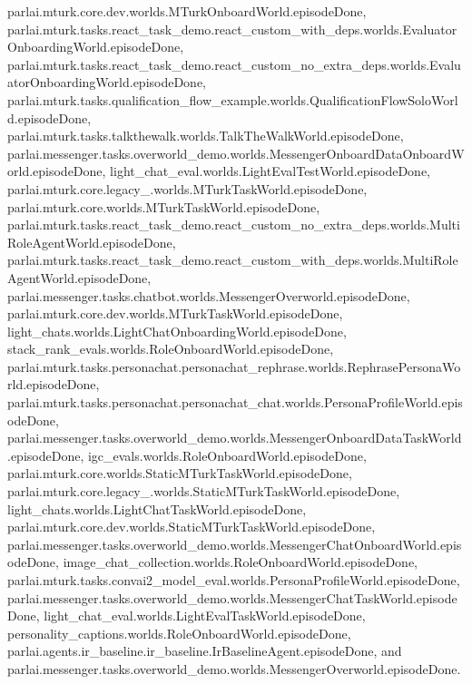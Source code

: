 parlai.\+mturk.\+core.\+dev.\+worlds.\+M\+Turk\+Onboard\+World.\+episode\+Done, parlai.\+mturk.\+tasks.\+react\+\_\+task\+\_\+demo.\+react\+\_\+custom\+\_\+with\+\_\+deps.\+worlds.\+Evaluator\+Onboarding\+World.\+episode\+Done, parlai.\+mturk.\+tasks.\+react\+\_\+task\+\_\+demo.\+react\+\_\+custom\+\_\+no\+\_\+extra\+\_\+deps.\+worlds.\+Evaluator\+Onboarding\+World.\+episode\+Done, parlai.\+mturk.\+tasks.\+qualification\+\_\+flow\+\_\+example.\+worlds.\+Qualification\+Flow\+Solo\+World.\+episode\+Done, parlai.\+mturk.\+tasks.\+talkthewalk.\+worlds.\+Talk\+The\+Walk\+World.\+episode\+Done, parlai.\+messenger.\+tasks.\+overworld\+\_\+demo.\+worlds.\+Messenger\+Onboard\+Data\+Onboard\+World.\+episode\+Done, light\+\_\+chat\+\_\+eval.\+worlds.\+Light\+Eval\+Test\+World.\+episode\+Done, parlai.\+mturk.\+core.\+legacy\+\_.\+worlds.\+M\+Turk\+Task\+World.\+episode\+Done, parlai.\+mturk.\+core.\+worlds.\+M\+Turk\+Task\+World.\+episode\+Done, parlai.\+mturk.\+tasks.\+react\+\_\+task\+\_\+demo.\+react\+\_\+custom\+\_\+no\+\_\+extra\+\_\+deps.\+worlds.\+Multi\+Role\+Agent\+World.\+episode\+Done, parlai.\+mturk.\+tasks.\+react\+\_\+task\+\_\+demo.\+react\+\_\+custom\+\_\+with\+\_\+deps.\+worlds.\+Multi\+Role\+Agent\+World.\+episode\+Done, parlai.\+messenger.\+tasks.\+chatbot.\+worlds.\+Messenger\+Overworld.\+episode\+Done, parlai.\+mturk.\+core.\+dev.\+worlds.\+M\+Turk\+Task\+World.\+episode\+Done, light\+\_\+chats.\+worlds.\+Light\+Chat\+Onboarding\+World.\+episode\+Done, stack\+\_\+rank\+\_\+evals.\+worlds.\+Role\+Onboard\+World.\+episode\+Done, parlai.\+mturk.\+tasks.\+personachat.\+personachat\+\_\+rephrase.\+worlds.\+Rephrase\+Persona\+World.\+episode\+Done, parlai.\+mturk.\+tasks.\+personachat.\+personachat\+\_\+chat.\+worlds.\+Persona\+Profile\+World.\+episode\+Done, parlai.\+messenger.\+tasks.\+overworld\+\_\+demo.\+worlds.\+Messenger\+Onboard\+Data\+Task\+World.\+episode\+Done, igc\+\_\+evals.\+worlds.\+Role\+Onboard\+World.\+episode\+Done, parlai.\+mturk.\+core.\+worlds.\+Static\+M\+Turk\+Task\+World.\+episode\+Done, parlai.\+mturk.\+core.\+legacy\+\_.\+worlds.\+Static\+M\+Turk\+Task\+World.\+episode\+Done, light\+\_\+chats.\+worlds.\+Light\+Chat\+Task\+World.\+episode\+Done, parlai.\+mturk.\+core.\+dev.\+worlds.\+Static\+M\+Turk\+Task\+World.\+episode\+Done, parlai.\+messenger.\+tasks.\+overworld\+\_\+demo.\+worlds.\+Messenger\+Chat\+Onboard\+World.\+episode\+Done, image\+\_\+chat\+\_\+collection.\+worlds.\+Role\+Onboard\+World.\+episode\+Done, parlai.\+mturk.\+tasks.\+convai2\+\_\+model\+\_\+eval.\+worlds.\+Persona\+Profile\+World.\+episode\+Done, parlai.\+messenger.\+tasks.\+overworld\+\_\+demo.\+worlds.\+Messenger\+Chat\+Task\+World.\+episode\+Done, light\+\_\+chat\+\_\+eval.\+worlds.\+Light\+Eval\+Task\+World.\+episode\+Done, personality\+\_\+captions.\+worlds.\+Role\+Onboard\+World.\+episode\+Done, parlai.\+agents.\+ir\+\_\+baseline.\+ir\+\_\+baseline.\+Ir\+Baseline\+Agent.\+episode\+Done, and parlai.\+messenger.\+tasks.\+overworld\+\_\+demo.\+worlds.\+Messenger\+Overworld.\+episode\+Done.

